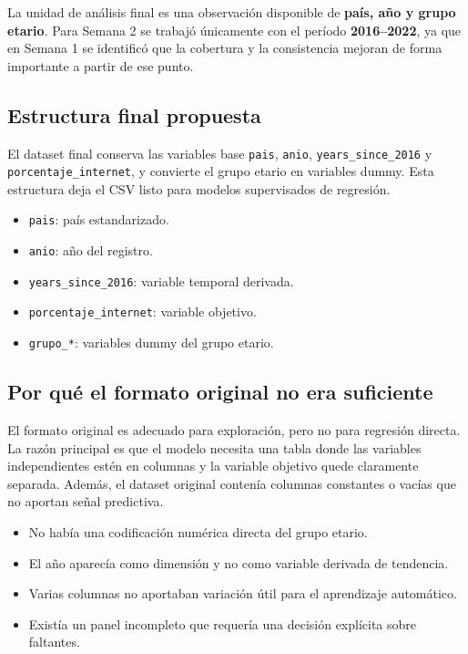 \documentclass[12pt,a4paper]{article}
\begin{document}
La unidad de análisis final es una observación disponible de \textbf{país, año y grupo etario}. Para Semana 2 se trabajó únicamente con el período \textbf{2016--2022}, ya que en Semana 1 se identificó que la cobertura y la consistencia mejoran de forma importante a partir de ese punto.

\subsection{Estructura final propuesta}

El dataset final conserva las variables base \texttt{pais}, \texttt{anio}, \texttt{years\_since\_2016} y \texttt{porcentaje\_internet}, y convierte el grupo etario en variables dummy. Esta estructura deja el CSV listo para modelos supervisados de regresión.

\begin{itemize}
    \item \texttt{pais}: país estandarizado.
    \item \texttt{anio}: año del registro.
    \item \texttt{years\_since\_2016}: variable temporal derivada.
    \item \texttt{porcentaje\_internet}: variable objetivo.
    \item \texttt{grupo\_*}: variables dummy del grupo etario.
\end{itemize}

\subsection{Por qué el formato original no era suficiente}

El formato original es adecuado para exploración, pero no para regresión directa. La razón principal es que el modelo necesita una tabla donde las variables independientes estén en columnas y la variable objetivo quede claramente separada. Además, el dataset original contenía columnas constantes o vacías que no aportan señal predictiva.

\begin{itemize}
    \item No había una codificación numérica directa del grupo etario.
    \item El año aparecía como dimensión y no como variable derivada de tendencia.
    \item Varias columnas no aportaban variación útil para el aprendizaje automático.
    \item Existía un panel incompleto que requería una decisión explícita sobre faltantes.
\end{itemize}
\end{document}
